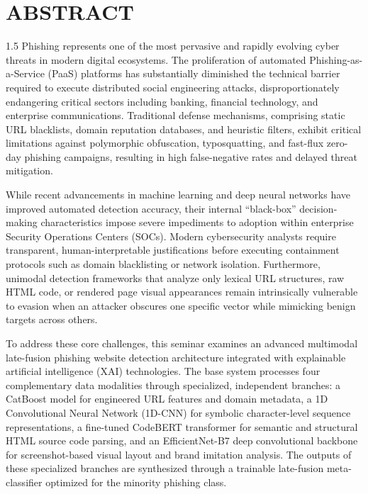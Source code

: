 \chapter*{ABSTRACT}

\begin{spacing}{1.5}
Phishing represents one of the most pervasive and rapidly evolving cyber threats in modern digital ecosystems. The proliferation of automated Phishing-as-a-Service (PaaS) platforms has substantially diminished the technical barrier required to execute distributed social engineering attacks, disproportionately endangering critical sectors including banking, financial technology, and enterprise communications. Traditional defense mechanisms, comprising static URL blacklists, domain reputation databases, and heuristic filters, exhibit critical limitations against polymorphic obfuscation, typosquatting, and fast-flux zero-day phishing campaigns, resulting in high false-negative rates and delayed threat mitigation.

While recent advancements in machine learning and deep neural networks have improved automated detection accuracy, their internal ``black-box'' decision-making characteristics impose severe impediments to adoption within enterprise Security Operations Centers (SOCs). Modern cybersecurity analysts require transparent, human-interpretable justifications before executing containment protocols such as domain blacklisting or network isolation. Furthermore, unimodal detection frameworks that analyze only lexical URL structures, raw HTML code, or rendered page visual appearances remain intrinsically vulnerable to evasion when an attacker obscures one specific vector while mimicking benign targets across others.

To address these core challenges, this seminar examines an advanced multimodal late-fusion phishing website detection architecture integrated with explainable artificial intelligence (XAI) technologies. The base system processes four complementary data modalities through specialized, independent branches: a CatBoost model for engineered URL features and domain metadata, a 1D Convolutional Neural Network (1D-CNN) for symbolic character-level sequence representations, a fine-tuned CodeBERT transformer for semantic and structural HTML source code parsing, and an EfficientNet-B7 deep convolutional backbone for screenshot-based visual layout and brand imitation analysis. The outputs of these specialized branches are synthesized through a trainable late-fusion meta-classifier optimized for the minority phishing class.


\end{spacing}

